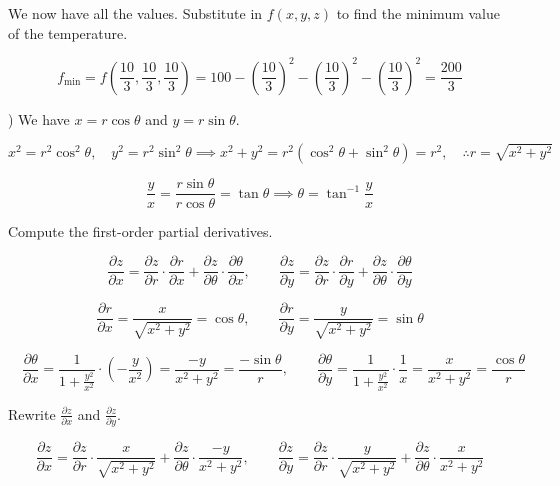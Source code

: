 \documentclass{article}
\begin{document}
\hfill

\noindent We now have all the values. Substitute in $f(x,y,z)$ to find the minimum value of the temperature.

\[f_{\text{min}}=f\left(\frac{10}{3},\frac{10}{3},\frac{10}{3}\right)=100-\left(\frac{10}{3}\right)^2-\left(\frac{10}{3}\right)^2-\left(\frac{10}{3}\right)^2=\boxed{\frac{200}{3}}\]

\hfill

) We have $x=r\cos\theta$ and $y=r\sin\theta$.

\[x^2=r^2\cos^2\theta,\quad y^2 =r^2\sin^2\theta\implies x^2+y^2=r^2\left(\cos^2\theta+\sin^2\theta\right)=r^2, \quad \therefore  r=\sqrt{x^2+y^2}\]

\[\frac{y}{x}=\frac{r\sin\theta}{r\cos\theta}=\tan\theta \implies \theta=\tan^{-1}\frac{y}{x}\]

\hfill

\noindent Compute the first-order partial derivatives.

\[\frac{\partial z}{\partial x}=\frac{\partial z}{\partial r}\cdot\frac{\partial r}{\partial x}+\frac{\partial z}{\partial \theta}\cdot\frac{\partial\theta}{\partial x},\quad\quad\frac{\partial z}{\partial y}=\frac{\partial z}{\partial r}\cdot\frac{\partial r}{\partial y} + \frac{\partial z}{\partial\theta}\cdot\frac{\partial\theta}{\partial y}\]

\hfill

\[\frac{\partial r}{\partial x}=\frac{x}{\sqrt{x^2+y^2}}=\cos\theta,\quad\quad\frac{\partial r}{\partial y}=\frac{y}{\sqrt{x^2+y^2}}=\sin\theta\]

\newpage

\[\quad\frac{\partial\theta}{\partial x}=\frac{1}{\displaystyle 1+\frac{y^2}{x^2}}\cdot \left(-\frac{y}{x^2}\right)=\frac{-y}{x^2+y^2}=\frac{-\sin\theta}{r},\quad\quad\frac{\partial\theta}{\partial y}=\frac{1}{\displaystyle1+\frac{y^2}{x^2}}\cdot\frac{1}{x}=\frac{x}{x^2+y^2}=\frac{\cos\theta}{r}\]

\hfill

\noindent Rewrite $\displaystyle\frac{\partial z}{\partial x}$ and $\displaystyle\frac{\partial z}{\partial y}$.

\[\frac{\partial z}{\partial x}=\frac{\partial z}{\partial r}\cdot\frac{x}{\sqrt{x^2+y^2}}+\frac{\partial z}{\partial\theta}\cdot\frac{-y}{x^2+y^2},\quad\quad\frac{\partial z}{\partial y}=\frac{\partial z}{\partial r}\cdot\frac{y}{\sqrt{x^2+y^2}}+\frac{\partial z}{\partial \theta}\cdot\frac{x}{x^2+y^2}\]
\end{document}
